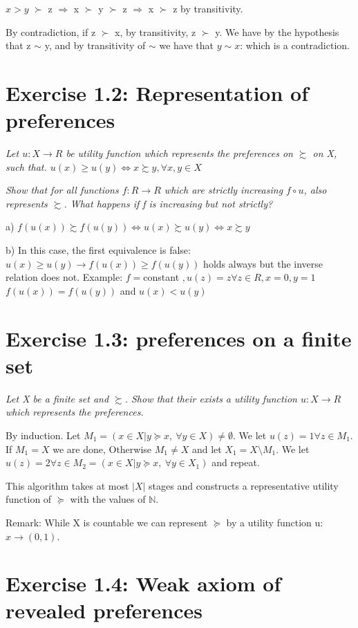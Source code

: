 \documentclass[11pt]{article} %
\begin{document}
$x>y$ $\succ$ z $\Rightarrow$ x $\succ$ y $\succ$ z $\Rightarrow$  x $\succ$ z by transitivity.

By contradiction, if  z $\succ$ x, by transitivity,  z $\succ$ y. We have by the hypothesis that z $\sim$ y, and by transitivity of $\sim$ we have that $y \sim x$: which is a contradiction. 

\section*{Exercise 1.2: Representation of preferences}

\textit{Let $u:X \rightarrow R$ be utility function which represents the preferences on $\succsim$ on X, such that.
$u(x) \geq u(y) \iff x \succsim y, \forall x,y \in X$}

\textit{Show that for all functions $f:R \rightarrow R$ which are strictly increasing $f \circ u$, also represents $\succsim$. What happens if f is increasing but not strictly?  }

a) $ f(u(x)) \succsim f(u(y)) \iff u(x) \succsim u(y) \iff x \succsim y$

b) In this case, the first equivalence is false:
$u(x) \geq u(y) \rightarrow f(u(x)) \geq f(u(y))$ holds always but the inverse relation does not. 
Example: $f=$constant $, u(z)=z \forall z \in R, x=0, y=1$
$f(u(x))=f(u(y))$ and $u(x)<u(y)$ 

\section*{Exercise 1.3: preferences on a finite set}

\textit{Let X be a finite set and $\succsim$. Show that their exists a utility function $u:X \rightarrow R$ which represents the preferences.}

By induction. Let $M_1 = (x \in X \vert y \succeq  x, \ \forall y \in X) \ne\emptyset $.
We let $u(z)=1 \forall z \in M_1$.
If $M_1 = X$ we are done, 
Otherwise $M_1 \neq X$ and let $ X_1= X \setminus M_1 $.
We let $u(z)=2 \forall z \in M_2= (x \in X \vert y \succeq  x, \ \forall y \in X_1)$
and repeat.

This algorithm takes at most $|X|$ stages and constructs a representative utility function of $\succeq$ with the values of $\mathbb{N} $.

Remark: While X is countable we can represent $ \succeq $ by a utility function u: $x \rightarrow (0,1)$.

\section*{Exercise 1.4: Weak axiom of revealed preferences}
\end{document}
